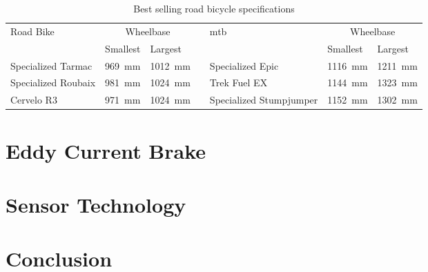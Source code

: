 \begin{table}[H]
	\renewcommand{\arraystretch}{1.2}
	\centering
	\caption{Best selling road bicycle specifications}
	\begin{tabularx}{\textwidth}{p{2.6cm} X Xp{0.05cm} p{2.6cm} X X}
		\toprule
		Road Bike           & \multicolumn{2}{c}{Wheelbase} &                         & \ac{mtb} & \multicolumn{2}{c}{Wheelbase}                                                     \\
		                    & Smallest                      & Largest                 &          &                               & Smallest                & Largest                 \\
		\midrule
		Specialized Tarmac  & \SI{969}{\milli\meter}        & \SI{1012}{\milli\meter} &          & Specialized Epic              & \SI{1116}{\milli\meter} & \SI{1211}{\milli\meter} \\
		Specialized Roubaix & \SI{981}{\milli\meter}        & \SI{1024}{\milli\meter} &          & Trek Fuel EX                  & \SI{1144}{\milli\meter} & \SI{1323}{\milli\meter} \\
		Cervelo R3          & \SI{971}{\milli\meter}        & \SI{1024}{\milli\meter} &          & Specialized Stumpjumper       & \SI{1152}{\milli\meter} & \SI{1302}{\milli\meter} \\
		\bottomrule
	\end{tabularx}
	\label{tab:bikes}
\end{table}

\section{Eddy Current Brake}
\section{Sensor Technology}
\section{Conclusion}
